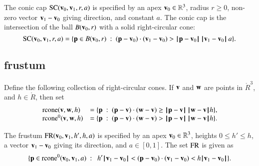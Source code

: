 
\begin{definition}
The conic cap $\op{SC}(\v_0,\v_1,r,a)$ is specified by an apex
$\v_0\in\ring{R}^3$,  radius $r\ge0$,  non-zero vector $\v_1-\v_0$ giving
direction, and constant $a$.  The conic cap is the intersection of
the ball $B(\v_0,r)$ with a solid right-circular cone:
    \begin{displaymath}
    \op{SC}(\v_0,\v_1,r,a)=\{\p \in B(\v_0,r) \mid (\p-\v_0)\cdot (\v_1-\v_0) > \norm{\p}{\v_0}\, \norm{\v_1}{\v_0}\, a\}.
    \end{displaymath}
%
%
%
%
\end{definition}

\subsection{frustum}
%

\begin{definition}[rcone]
%
Define the following collection of right-circular cones.
If $\v$ and $\w$ are points in $\ring{R}^3$, and
  $h\in\ring{R}$, then set
  \begin{displaymath}\begin{array}{lll}
    \op{rcone}(\v,\w,h) &= \{\p\mid (\p-\v)\cdot (\w-\v) \ge \norm{\p}{\v}\,\norm{\w}{\v} h\},\\
    \op{rcone}^0(\v,\w,h) &= \{\p\mid (\p-\v)\cdot (\w-\v) > \norm{\p}{\v}\,\norm{\w}{\v} h\}.\\
    \end{array}
    \end{displaymath}
\end{definition}
%
%
%
%


\begin{definition}[frustum, FR] The frustum
$\op{FR}(\v_0,\v_1,h',h,a)$ is specified by an apex $\v_0\in\ring{R}^3$, heights
$0\le h'\le h$, a vector $\v_1-\v_0$ giving its direction, and
$a\in[0,1]$. The set $\op{FR}$ is given as
    \begin{displaymath}
    \{ \p \in\op{rcone}^0(\v_0,\v_1,a) \mid \ 
       h'\norm{\v_1}{\v_0} < (\p-\v_0) \cdot (\v_1-\v_0) < h\norm{\v_1}{\v_0} \}.
    \end{displaymath}
%
%
%
\end{definition}

